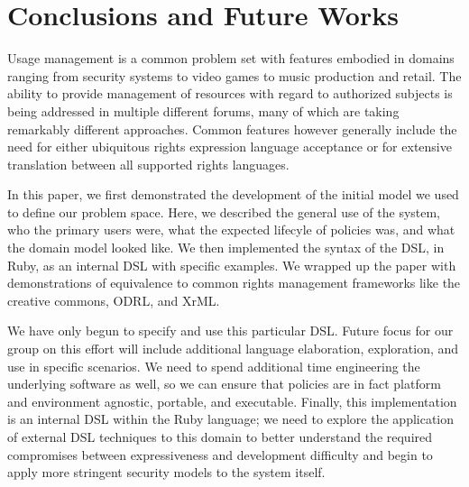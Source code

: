 \section{Conclusions and Future Works}
Usage management is a common problem set with features embodied in domains ranging from security systems to video games to music production and retail.  The ability to provide management of resources with regard to authorized subjects is being addressed in multiple different forums, many of which are taking remarkably different approaches.  Common features however generally include the need for either ubiquitous rights expression language acceptance or for extensive translation between all supported rights languages.

In this paper, we first demonstrated the development of the initial model we used to define our problem space.  Here, we described the general use of the system, who the primary users were, what the expected lifecyle of policies was, and what the domain model looked like.  We then implemented the syntax of the DSL, in Ruby, as an internal DSL with specific examples.  We wrapped up the paper with demonstrations of equivalence to common rights management frameworks like the creative commons, ODRL, and XrML.

We have only begun to specify and use this particular DSL.  Future focus for our group on this effort will include additional language elaboration, exploration, and use in specific scenarios.  We need to spend additional time engineering the underlying software as well, so we can ensure that policies are in fact platform and environment agnostic, portable, and executable.  Finally, this implementation is an internal DSL within the Ruby language; we need to explore the application of external DSL techniques to this domain to better understand the required compromises between expressiveness and development difficulty and begin to apply more stringent security models to the system itself.